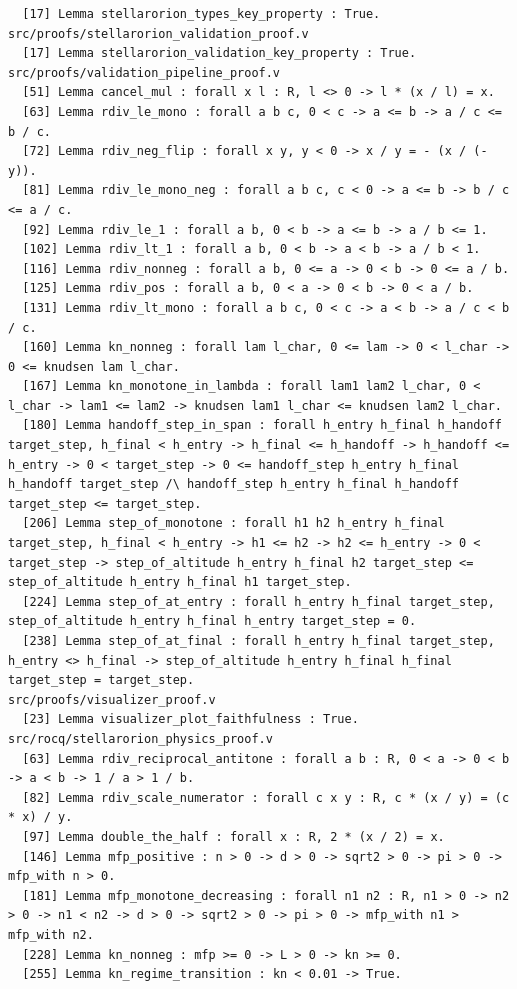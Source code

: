 \documentclass[11pt]{article}
\theoremstyle{definition}
\begin{document}
\begin{verbatim}
  [17] Lemma stellarorion_types_key_property : True.
src/proofs/stellarorion_validation_proof.v
  [17] Lemma stellarorion_validation_key_property : True.
src/proofs/validation_pipeline_proof.v
  [51] Lemma cancel_mul : forall x l : R, l <> 0 -> l * (x / l) = x.
  [63] Lemma rdiv_le_mono : forall a b c, 0 < c -> a <= b -> a / c <= b / c.
  [72] Lemma rdiv_neg_flip : forall x y, y < 0 -> x / y = - (x / (- y)).
  [81] Lemma rdiv_le_mono_neg : forall a b c, c < 0 -> a <= b -> b / c <= a / c.
  [92] Lemma rdiv_le_1 : forall a b, 0 < b -> a <= b -> a / b <= 1.
  [102] Lemma rdiv_lt_1 : forall a b, 0 < b -> a < b -> a / b < 1.
  [116] Lemma rdiv_nonneg : forall a b, 0 <= a -> 0 < b -> 0 <= a / b.
  [125] Lemma rdiv_pos : forall a b, 0 < a -> 0 < b -> 0 < a / b.
  [131] Lemma rdiv_lt_mono : forall a b c, 0 < c -> a < b -> a / c < b / c.
  [160] Lemma kn_nonneg : forall lam l_char, 0 <= lam -> 0 < l_char -> 0 <= knudsen lam l_char.
  [167] Lemma kn_monotone_in_lambda : forall lam1 lam2 l_char, 0 < l_char -> lam1 <= lam2 -> knudsen lam1 l_char <= knudsen lam2 l_char.
  [180] Lemma handoff_step_in_span : forall h_entry h_final h_handoff target_step, h_final < h_entry -> h_final <= h_handoff -> h_handoff <= h_entry -> 0 < target_step -> 0 <= handoff_step h_entry h_final h_handoff target_step /\ handoff_step h_entry h_final h_handoff target_step <= target_step.
  [206] Lemma step_of_monotone : forall h1 h2 h_entry h_final target_step, h_final < h_entry -> h1 <= h2 -> h2 <= h_entry -> 0 < target_step -> step_of_altitude h_entry h_final h2 target_step <= step_of_altitude h_entry h_final h1 target_step.
  [224] Lemma step_of_at_entry : forall h_entry h_final target_step, step_of_altitude h_entry h_final h_entry target_step = 0.
  [238] Lemma step_of_at_final : forall h_entry h_final target_step, h_entry <> h_final -> step_of_altitude h_entry h_final h_final target_step = target_step.
src/proofs/visualizer_proof.v
  [23] Lemma visualizer_plot_faithfulness : True.
src/rocq/stellarorion_physics_proof.v
  [63] Lemma rdiv_reciprocal_antitone : forall a b : R, 0 < a -> 0 < b -> a < b -> 1 / a > 1 / b.
  [82] Lemma rdiv_scale_numerator : forall c x y : R, c * (x / y) = (c * x) / y.
  [97] Lemma double_the_half : forall x : R, 2 * (x / 2) = x.
  [146] Lemma mfp_positive : n > 0 -> d > 0 -> sqrt2 > 0 -> pi > 0 -> mfp_with n > 0.
  [181] Lemma mfp_monotone_decreasing : forall n1 n2 : R, n1 > 0 -> n2 > 0 -> n1 < n2 -> d > 0 -> sqrt2 > 0 -> pi > 0 -> mfp_with n1 > mfp_with n2.
  [228] Lemma kn_nonneg : mfp >= 0 -> L > 0 -> kn >= 0.
  [255] Lemma kn_regime_transition : kn < 0.01 -> True.

\end{verbatim}
\end{document}
